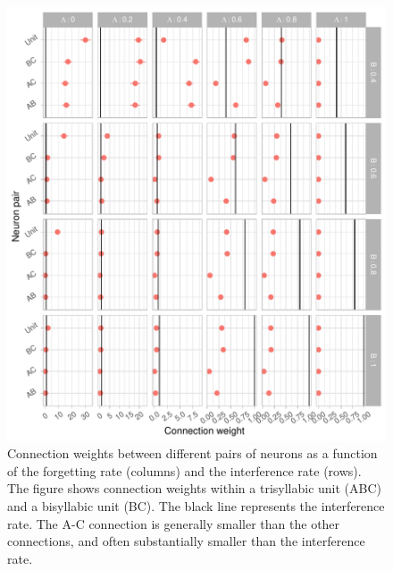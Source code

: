 \documentclass[
]{article}
\begin{document}
\begin{figure}

{\centering \includegraphics[width=1\linewidth]{tp_model_subunits_files/figure-latex/subunit-experiment-global-create-plot_weights-1} 

}

\caption{Connection weights between different pairs of neurons as a function of the forgetting rate (columns) and the interference rate (rows). The figure shows connection weights within a trisyllabic unit (ABC) and a bisyllabic unit (BC). The black line represents the interference rate. The A-C connection is generally smaller than the other connections, and often substantially smaller than the interference rate.}\label{figsubunit-experiment-global-create-plot_weights}
\end{figure}

  
\end{document}

